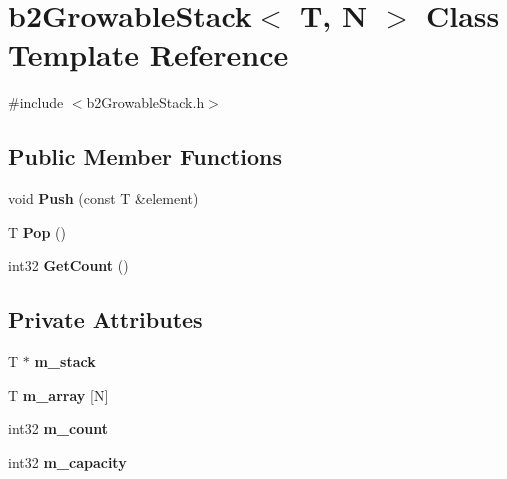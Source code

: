 \hypertarget{classb2GrowableStack}{}\section{b2\+Growable\+Stack$<$ T, N $>$ Class Template Reference}
\label{classb2GrowableStack}


{\ttfamily \#include $<$b2\+Growable\+Stack.\+h$>$}

\subsection*{Public Member Functions}
\begin{DoxyCompactItemize}
\item 
\mbox{\label{classb2GrowableStack_a23661327d64ff72d1ec8d6bcdb6d8992}} 
void {\bfseries Push} (const T \&element)
\item 
\mbox{\label{classb2GrowableStack_a53e53dcd6bff8308405a881f02957bc8}} 
T {\bfseries Pop} ()
\item 
\mbox{\label{classb2GrowableStack_a3049e76ba7182b988450bfe94d30d5aa}} 
int32 {\bfseries Get\+Count} ()
\end{DoxyCompactItemize}
\subsection*{Private Attributes}
\begin{DoxyCompactItemize}
\item 
\mbox{\label{classb2GrowableStack_a0ffe2286a06066938a7413cef5689e7d}} 
T $\ast$ {\bfseries m\+\_\+stack}
\item 
\mbox{\label{classb2GrowableStack_a0df427a912ca2e6d8eecfc10e84162b3}} 
T {\bfseries m\+\_\+array} \mbox{[}N\mbox{]}
\item 
\mbox{\label{classb2GrowableStack_ab1ac57e30436c7501677143e0d7a051b}} 
int32 {\bfseries m\+\_\+count}
\item 
\mbox{\label{classb2GrowableStack_aede2309b9194c72f7096da16e2bb8c0a}} 
int32 {\bfseries m\+\_\+capacity}
\end{DoxyCompactItemize}



